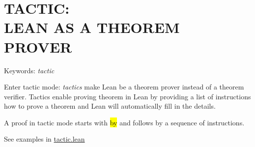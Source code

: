 \chapter{TACTIC: \\ LEAN AS A THEOREM PROVER}

Keywords: \textit{tactic}

Enter tactic mode: \textit{tactics} make Lean be a theorem prover instead of a theorem verifier. Tactics enable proving theorem in Lean by providing a list of instructions how to prove a theorem and Lean will automatically fill in the details.

A proof in tactic mode starts with \hl{by} and follows by a sequence of instructions.

See examples in \href{../theorem_proving_in_lean_4/theorem_proving/tactic.lean}{tactic.lean}
